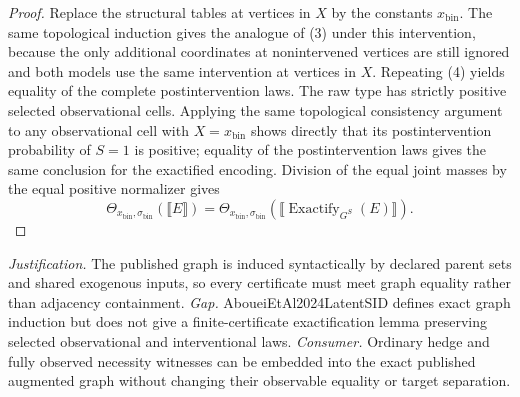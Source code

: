 \documentclass{article}
\begin{document}
\begin{proof}
Replace the structural tables at vertices in \(X\) by the constants \(x_{\mathrm{bin}}\).  The same topological induction gives the analogue of (3) under this intervention, because the only additional coordinates at nonintervened vertices are still ignored and both models use the same intervention at vertices in \(X\).  Repeating (4) yields equality of the complete postintervention laws.  The raw type has strictly positive selected observational cells.  Applying the same topological consistency argument to any observational cell with \(X=x_{\mathrm{bin}}\) shows directly that its postintervention probability of \(S=1\) is positive; equality of the postintervention laws gives the same conclusion for the exactified encoding.  Division of the equal joint masses by the equal positive normalizer gives
\[
 \Theta_{x_{\mathrm{bin}},\sigma_{\mathrm{bin}}}(\llbracket E\rrbracket)
 =\Theta_{x_{\mathrm{bin}},\sigma_{\mathrm{bin}}}
   (\llbracket\operatorname{Exactify}_{G^S}(E)\rrbracket).
\]
\end{proof}
\par\smallskip\noindent \textit{Justification.} The published graph is induced syntactically by declared parent sets and shared exogenous inputs, so every certificate must meet graph equality rather than adjacency containment. \textit{Gap.} AboueiEtAl2024LatentSID defines exact graph induction but does not give a finite-certificate exactification lemma preserving selected observational and interventional laws. \textit{Consumer.} Ordinary hedge and fully observed necessity witnesses can be embedded into the exact published augmented graph without changing their observable equality or target separation.
\end{document}
